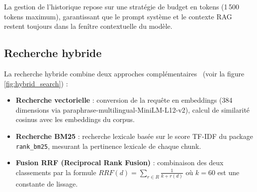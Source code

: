 \documentclass[12pt,a4paper,oneside]{report}
\begin{document}
La gestion de l'historique repose sur une strat\'{e}gie de budget en tokens (1\,500 tokens maximum), garantissant que le prompt syst\`{e}me et le contexte RAG restent toujours dans la fen\^{i}tre contextuelle du mod\`{e}le.



\subsection{Recherche hybride}



La recherche hybride combine deux approches compl\'{e}mentaires~\cite{lewis2020rag} (voir la figure \ref{fig:hybrid_search}) :



\begin{itemize}[leftmargin=1.2cm]

\item \textbf{Recherche vectorielle} : conversion de la requ\^{e}te en embeddings (384 dimensions via paraphrase-multilingual-MiniLM-L12-v2), calcul de similarit\'{e} cosinus avec les embeddings du corpus.

\item \textbf{Recherche BM25} : recherche lexicale bas\'{e}e sur le score TF-IDF du package \texttt{rank\_bm25}, mesurant la pertinence lexicale de chaque chunk.

\item \textbf{Fusion RRF (Reciprocal Rank Fusion)} : combinaison des deux classements par la formule $RRF(d) = \sum_{r \in R} \frac{1}{k + r(d)}$ o\`{u} $k=60$ est une constante de lissage.

\end{itemize}
\end{document}
